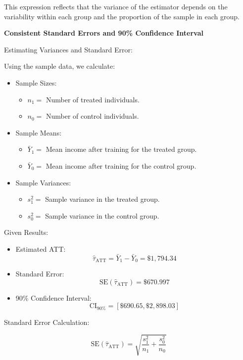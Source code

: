 \documentclass{article}
\begin{document}
This expression reflects that the variance of the estimator depends on the variability within each group and the proportion of the sample in each group.

\textbf{Consistent Standard Errors and 90\% Confidence Interval}

Estimating Variances and Standard Error:

Using the sample data, we calculate:

\begin{itemize}
    \item Sample Sizes:
        \begin{itemize}
            \item \(n_1 =\) Number of treated individuals.
            \item \(n_0 =\) Number of control individuals.
        \end{itemize}
    \item Sample Means:
        \begin{itemize}
            \item \(\bar{Y}_1 =\) Mean income after training for the treated group.
            \item \(\bar{Y}_0 =\) Mean income after training for the control group.
        \end{itemize}
    \item Sample Variances:
        \begin{itemize}
            \item \(s_1^2 =\) Sample variance in the treated group.
            \item \(s_0^2 =\) Sample variance in the control group.
        \end{itemize}
\end{itemize}

Given Results:

\begin{itemize}
    \item Estimated ATT:
        \[
        \hat{\tau}_{\text{ATT}} = \bar{Y}_1 - \bar{Y}_0 = \$1,794.34
        \]
    \item Standard Error:
        \[
        \text{SE}(\hat{\tau}_{\text{ATT}}) = \$670.997
        \]
    \item 90\% Confidence Interval:
        \[
        \text{CI}_{90\%} = [\$690.65, \$2,898.03]
        \]
\end{itemize}

Standard Error Calculation:

\[
\text{SE}(\hat{\tau}_{\text{ATT}}) = \sqrt{\frac{s_1^2}{n_1} + \frac{s_0^2}{n_0}}
\]
\end{document}
